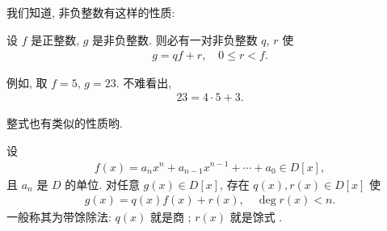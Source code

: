 \subsection*{\DivisionAlgorithm}
\markright{\DivisionAlgorithm}

我们知道, 非负整数有这样的性质:

\begin{proposition}
    设 $f$ 是正整数, $g$ 是非负整数. 则必有一对非负整数 $q$, $r$ 使
    \begin{align*}
        g = qf + r, \quad 0 \leq r < f.
    \end{align*}
\end{proposition}

例如, 取 $f=5$, $g=23$. 不难看出,
\begin{align*}
    23 = 4 \cdot 5 + 3.
\end{align*}

整式也有类似的性质哟.

\begin{proposition}
    设
    \begin{align*}
        f(x) = a_n x^n + a_{n-1} x^{n-1} + \cdots + a_0 \in D[x],
    \end{align*}
    且 $a_n$ 是 $D$ 的单位. 对任意 $g(x) \in D[x]$, 存在 $q(x), r(x) \in D[x]$ 使
    \begin{align*}
        g(x) = q(x) f(x) + r(x), \quad \deg r(x) < n.
    \end{align*}
    一般称其为带馀除法: $q(x)$ 就是商 ; $r(x)$ 就是馀式 .
\end{proposition}

